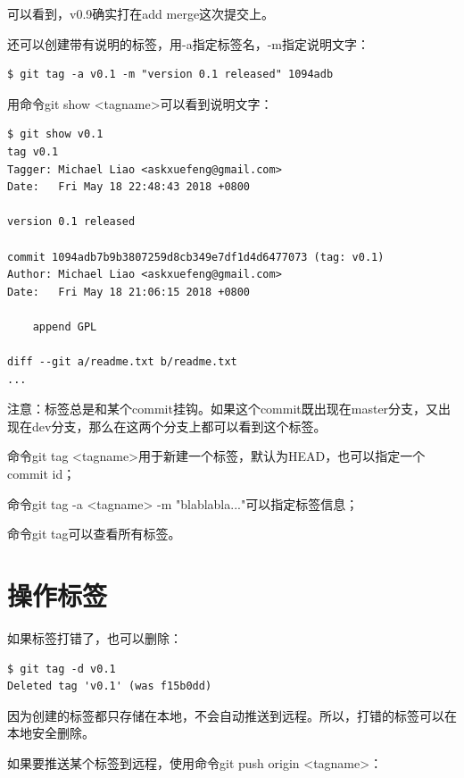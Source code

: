 可以看到，v0.9确实打在add merge这次提交上。

还可以创建带有说明的标签，用-a指定标签名，-m指定说明文字：

\begin{verbatim}
$ git tag -a v0.1 -m "version 0.1 released" 1094adb
\end{verbatim}

用命令git show <tagname>可以看到说明文字：

\begin{verbatim}
$ git show v0.1
tag v0.1
Tagger: Michael Liao <askxuefeng@gmail.com>
Date:   Fri May 18 22:48:43 2018 +0800

version 0.1 released

commit 1094adb7b9b3807259d8cb349e7df1d4d6477073 (tag: v0.1)
Author: Michael Liao <askxuefeng@gmail.com>
Date:   Fri May 18 21:06:15 2018 +0800

    append GPL

diff --git a/readme.txt b/readme.txt
...
\end{verbatim}

 注意：标签总是和某个commit挂钩。如果这个commit既出现在master分支，又出现在dev分支，那么在这两个分支上都可以看到这个标签。
 
 \begin{tcolorbox}

命令git tag <tagname>用于新建一个标签，默认为HEAD，也可以指定一个commit id；

命令git tag -a <tagname> -m "blablabla..."可以指定标签信息；

命令git tag可以查看所有标签。
\end{tcolorbox}

\section{操作标签}
如果标签打错了，也可以删除：

\begin{verbatim}
$ git tag -d v0.1
Deleted tag 'v0.1' (was f15b0dd)
\end{verbatim}

因为创建的标签都只存储在本地，不会自动推送到远程。所以，打错的标签可以在本地安全删除。

如果要推送某个标签到远程，使用命令git push origin <tagname>：

